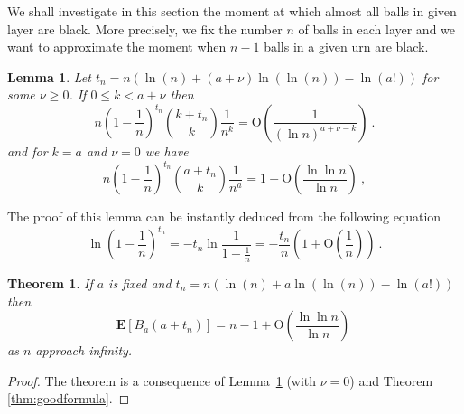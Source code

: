 \documentclass[submission]{dmtcs}
\newtheorem{lemma}{Lemma}
\newtheorem{theorem}{Theorem}
\newcommand{\E}[1]{\mathbf{E}\left[#1\right]}
\newcommand{\BigO}[1]{\mathrm{O}\left(#1\right)}
\begin{document}
We shall investigate in this section the moment at which almost all
balls in given layer are black. More precisely, we fix the number $n$ of balls 
in each layer and we want to approximate the moment when $n-1$ balls in 
a given urn are black.

\begin{lemma}
\label{xxx2}
Let $t_n = n(\ln(n) + (a + \nu )\ln(\ln(n)) - \ln(a!))$ for some $\nu \geq 0$.
If $0\leq k < a + \nu$ then
$$
 n\left(1-\frac1n\right)^{t_n} \binom{k+t_n}{k}\frac{1}{n^k} = 
 \BigO{\frac{1}{(\ln n)^{a + \nu -k}}}~.
$$
and for $k=a$ and $\nu=0$ we have
$$
 n\left(1-\frac1n\right)^{t_n} \binom{a+t_n}{k}\frac{1}{n^a} = 
 1 + \BigO{\frac{\ln\ln n}{\ln n}}~,
$$
\end{lemma}

The proof of this lemma can be instantly deduced from the following
equation
\begin{equation}
\label{lll:1}
\ln \left(1-\frac1n\right)^{t_n} = 
  - t_n \ln\frac{1}{1-\frac1n} = 
 - \frac{t_n}{n}\left(1+\BigO{\frac1n}\right)~.
\end{equation}
%


\begin{theorem}\label{thm4xc}
If  $a$ is fixed and $t_n = n(\ln(n) + a \ln(\ln(n)) - \ln(a!))$ then
$$
\E{B_{a}(a+t_n)} = n-1 + \BigO{\frac{\ln\ln n}{\ln n}}~
$$
as $n$ approach infinity.
\end{theorem}

\begin{proof}
The theorem is a consequence of Lemma~\ref{xxx2} (with $\nu=0$) and 
Theorem \ref{thm:goodformula}.
\end{proof}
\end{document}
